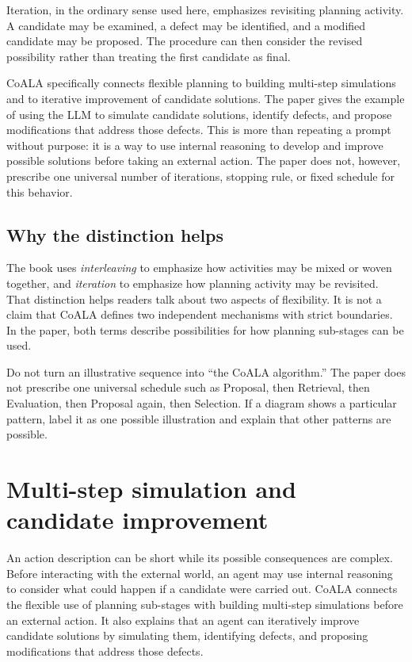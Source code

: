 Iteration, in the ordinary sense used here, emphasizes revisiting planning activity. A candidate may be examined, a defect may be identified, and a modified candidate may be proposed. The procedure can then consider the revised possibility rather than treating the first candidate as final.

CoALA specifically connects flexible planning to building multi-step simulations and to iterative improvement of candidate solutions. The paper gives the example of using the LLM to simulate candidate solutions, identify defects, and propose modifications that address those defects. This is more than repeating a prompt without purpose: it is a way to use internal reasoning to develop and improve possible solutions before taking an external action. The paper does not, however, prescribe one universal number of iterations, stopping rule, or fixed schedule for this behavior.

\subsection{Why the distinction helps}

The book uses \emph{interleaving} to emphasize how activities may be mixed or woven together, and \emph{iteration} to emphasize how planning activity may be revisited. That distinction helps readers talk about two aspects of flexibility. It is not a claim that CoALA defines two independent mechanisms with strict boundaries. In the paper, both terms describe possibilities for how planning sub-stages can be used.

\begin{warningbox}
Do not turn an illustrative sequence into ``the CoALA algorithm.'' The paper does not prescribe one universal schedule such as Proposal, then Retrieval, then Evaluation, then Proposal again, then Selection. If a diagram shows a particular pattern, label it as one possible illustration and explain that other patterns are possible.
\end{warningbox}

\section{Multi-step simulation and candidate improvement}
\label{sec:candidate-improvement}

An action description can be short while its possible consequences are complex. Before interacting with the external world, an agent may use internal reasoning to consider what could happen if a candidate were carried out. CoALA connects the flexible use of planning sub-stages with building multi-step simulations before an external action. It also explains that an agent can iteratively improve candidate solutions by simulating them, identifying defects, and proposing modifications that address those defects.

